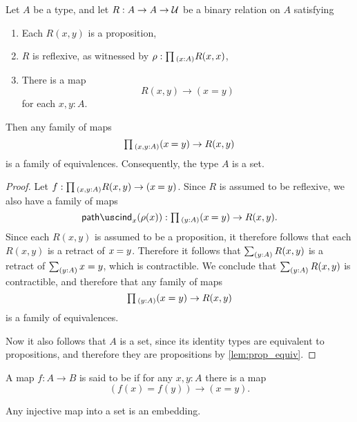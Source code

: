 \begin{thm}\label{lem:prop_to_id}
Let $A$ be a type, and let $R:A\to A\to\mathcal{U}$ be a binary relation on $A$ satisfying
\begin{enumerate}
\item Each $R(x,y)$ is a proposition,
\item $R$ is reflexive, as witnessed by $\rho:\prd{x:A}R(x,x)$,
\item There is a map
  \begin{equation*}
    R(x,y)\to (x=y)
  \end{equation*}
  for each $x,y:A$.
\end{enumerate}
Then any family of maps
\begin{equation*}
\prd{x,y:A}(\id{x}{y})\to R(x,y)
\end{equation*}
is a family of equivalences. Consequently, the type $A$ is a set.
\end{thm}

\begin{proof}
Let $f:\prd{x,y:A}R(x,y)\to(\id{x}{y})$. 
Since $R$ is assumed to be reflexive, we also have a family of maps
\begin{equation*}
\pathind_x(\rho(x)):\prd{y:A}(\id{x}{y})\to R(x,y).
\end{equation*}
Since each $R(x,y)$ is assumed to be a proposition, it therefore follows that each $R(x,y)$ is a retract of $\id{x}{y}$. Therefore it follows that $\sm{y:A}R(x,y)$ is a retract of $\sm{y:A}x=y$, which is contractible. We conclude that $\sm{y:A}R(x,y)$ is contractible, and therefore that any family of maps
\begin{equation*}
  \prd{y:A}(x=y)\to R(x,y)
\end{equation*}
is a family of equivalences.

Now it also follows that $A$ is a set, since its identity types are equivalent to propositions, and therefore they are propositions by \cref{lem:prop_equiv}. 
\end{proof}

\begin{defn}
  A map $f:A\to B$ is said to be  if for any $x,y:A$ there is a map
  \begin{equation*}
    (f(x)=f(y))\to (x=y).
  \end{equation*}
\end{defn}

\begin{cor}
  Any injective map into a set is an embedding.
\end{cor}

